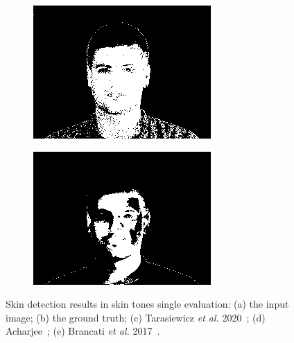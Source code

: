 \begin{figure}[h]
\begin{subfigure}[b]{0.18\textwidth}
         \centering
         \includegraphics[width=\textwidth]{images/results/base_st/m-022-5.color.d3_bayes.png}
         \caption{}
     \end{subfigure}
     \hfill
     \begin{subfigure}[b]{0.18\textwidth}
         \centering
         \includegraphics[width=\textwidth]{images/results/base_st/m-022-5.color.d3_dyc.png}
         \caption{}
     \end{subfigure}
        \caption{Skin detection results in skin tones single evaluation: (a) the input image; (b) the ground truth; (c) Tarasiewicz \textit{et al.} 2020~\cite{tarasiewicz2020skinny}; (d) Acharjee~\cite{acharjee2018skin}; (e) Brancati \textit{et al.} 2017~\cite{brancati2017human}.}
        \label{fig:base-skintones-samples}
\end{figure}


